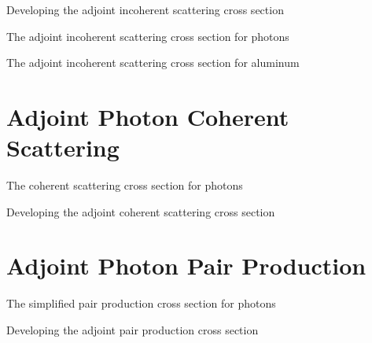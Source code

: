 \documentclass{beamer}
\begin{document}
\begin{frame}{Developing the adjoint incoherent scattering cross section}

\end{frame}

\begin{frame}{The adjoint incoherent scattering cross section for photons}

\end{frame}

\begin{frame}{The adjoint incoherent scattering cross section for aluminum}

\end{frame}

\section{Adjoint Photon Coherent Scattering}
\begin{frame}{The coherent scattering cross section for photons}

\end{frame}

\begin{frame}{Developing the adjoint coherent scattering cross section}

\end{frame}

\section{Adjoint Photon Pair Production}
\begin{frame}{The simplified pair production cross section for photons}

\end{frame}

\begin{frame}{Developing the adjoint pair production cross section}

\end{frame}
\end{document}
